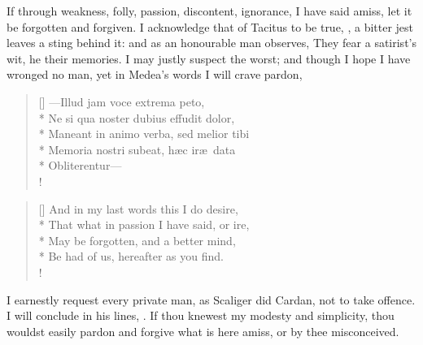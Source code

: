 If through weakness, folly, passion, discontent, ignorance, I have
said amiss, let it be forgotten and forgiven. I acknowledge that of
 Tacitus to be true, , a bitter jest leaves a sting behind it:
and as an honourable man observes, They fear a satirist's wit, he
their memories. I may justly suspect the worst; and though I hope I
have wronged no man, yet in Medea's words I will crave pardon,
%
\begin{latin}
\settowidth{\versewidth}{Maneant in animo verba, sed melior tibi}
\begin{verse}[\versewidth]
---Illud jam voce extrema peto,\\*
Ne si qua noster dubius effudit dolor,\\*
Maneant in animo verba, sed melior tibi\\*
Memoria nostri subeat, h\ae{}c ir\ae{}\ data\\*
Obliterentur---\\!
\end{verse}
\end{latin}
\translationrule
\settowidth{\versewidth}{That what in passion I have said, or ire,}
\begin{verse}[\versewidth]
And in my last words this I do desire,\\*
That what in passion I have said, or ire,\\*
May be forgotten, and a better mind,\\*
Be had of us, hereafter as you find.\\!
\end{verse}

I earnestly request every private man, as Scaliger did Cardan, not to
take offence. I will conclude in his lines, . If thou knewest my modesty and simplicity, thou wouldst
easily pardon and forgive what is here amiss, or by thee misconceived.

